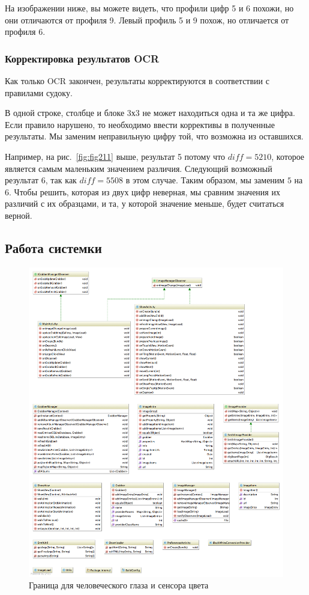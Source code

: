 На изображении ниже, вы можете видеть, что профили цифр 5 и 6 похожи, но они отличаются от профиля 9. Левый профиль 5 и 9 похож, но отличается от профиля 6.

\subsubsection{Корректировка результатов OCR}

Как только OCR закончен, результаты корректируются в соответствии с правилами судоку. 

В одной строке, столбце и блоке 3х3 не может находиться одна и та же цифра. Если правило нарушено, то необходимо ввести коррективы в полученные результаты. Мы заменим неправильную цифру той, что возможна из оставшихся. 

Например, на рис.~\ref{fig:fig211} выше, результат 5 потому что $diff = 5210$, которое является самым маленьким значением различия. Следующий возможный результат $6$, так как $diff = 5508$ в этом случае. Таким образом, мы заменим $5$ на $6$. Чтобы решить, которая из двух цифр неверная, мы сравним значения их различий с их образцами, и та, у которой значение меньше, будет считаться верной. 

\subsection{Работа системки}
\begin{figure}[ht]
  \centering
  \includegraphics[width=\textwidth]{inc/raster/design2-100.png}
  \caption{Граница для человеческого глаза и сенсора цвета}
  \label{fig:fig2100}
\end{figure}

